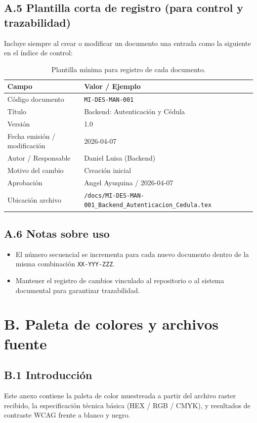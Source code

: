 \documentclass[a4paper,12pt]{article}
\begin{document}
    \subsection*{A.5 Plantilla corta de registro (para control y trazabilidad)}
    Incluye siempre al crear o modificar un documento una entrada como la siguiente en el índice de control:

    \begin{table}[H]
    \centering
    \begin{tabular}{p{3.6cm} p{7cm}}
    \toprule
    \textbf{Campo} & \textbf{Valor / Ejemplo} \\ \midrule
    Código documento & \texttt{MI-DES-MAN-001} \\
    Título & Backend: Autenticación y Cédula \\
    Versión & 1.0 \\
    Fecha emisión / modificación & 2026-04-07 \\
    Autor / Responsable & Daniel Luisa (Backend) \\
    Motivo del cambio & Creación inicial \\
    Aprobación & Angel Ayuquina / 2026-04-07 \\
    Ubicación archivo & \texttt{/docs/MI-DES-MAN-001\_Backend\_Autenticacion\_Cedula.tex} \\
    \bottomrule
    \end{tabular}
    \caption*{\footnotesize{Plantilla mínima para registro de cada documento.}}
    \end{table}

    \subsection*{A.6 Notas sobre uso}
    \begin{itemize}
      \item El número secuencial se incrementa para cada nuevo documento dentro de la misma combinación \texttt{XX-YYY-ZZZ}.  
      \item Mantener el registro de cambios vinculado al repositorio o al sistema documental para garantizar trazabilidad.  
    \end{itemize}

    \section*{B. Paleta de colores y archivos fuente}

    \subsection*{B.1 Introducción}
    Este anexo contiene la paleta de color muestreada a partir del archivo raster recibido, la especificación técnica básica (HEX / RGB / CMYK), y resultados de contraste WCAG frente a blanco y negro.
\end{document}
